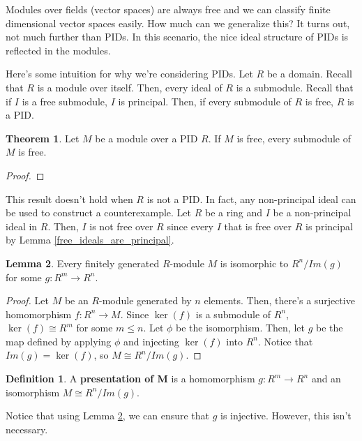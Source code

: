 \documentclass{article}
\theoremstyle{definition}
\newtheorem{definition}{Definition}
\newtheorem{theorem}{Theorem}[section]
\newtheorem{lemma}[theorem]{Lemma}
\begin{document}
Modules over fields (vector spaces) are always free and we can classify finite dimensional vector spaces easily.
How much can we generalize this? It turns out, not much further than PIDs. In this scenario, the nice ideal structure 
of PIDs is reflected in the modules.

Here's some intuition for why we're considering PIDs. Let $R$ be a domain. Recall that $R$ is a module
over itself. Then, every ideal of $R$ is a submodule. Recall that if $I$ is a free submodule, $I$ is principal.
Then, if every submodule of $R$ is free, $R$ is a PID.

\begin{theorem}
    Let $M$ be a module over a PID $R$. If $M$ is free, every submodule of $M$ is free.
\end{theorem}
\begin{proof}
    
\end{proof}

This result doesn't hold when $R$ is not a PID.
In fact, any non-principal ideal can be used to construct a counterexample. 
Let $R$ be a ring and $I$ be a non-principal ideal in $R$. 
Then, $I$ is not free over $R$ since every $I$ that is free over $R$ is principal by Lemma \ref{free_ideals_are_principal}.

\begin{lemma}\label{injective_presentations_exist}
    Every finitely generated $R$-module $M$ is isomorphic to $R^{n}/Im(g)$ for some $g: R^{m} \xrightarrow{} R^{n}$.
\end{lemma}
\begin{proof}
    Let $M$ be an $R$-module generated by $n$ elements.
    Then, there's a surjective homomorphism $f:R^{n} \xrightarrow{} M$.
    Since $\ker(f)$ is a submodule of $R^{n}$, $\ker(f) \cong R^{m}$ for some $m \leq n$. Let $\phi$ be the isomorphism.
    Then, let $g$ be the map defined by applying $\phi$ and injecting $\ker(f)$ into $R^{n}$. Notice that $Im(g) = \ker(f)$,
    so $M \cong R^{n}/Im(g)$.
\end{proof}

\begin{definition}
    A \textbf{presentation of M} is a homomorphism $g: R^{m} \xrightarrow{} R^{n}$ and an isomorphism $M \cong R^{n}/Im(g)$.
\end{definition}

Notice that using Lemma \ref{injective_presentations_exist}, we can ensure that $g$ is injective.
However, this isn't necessary.
\end{document}
